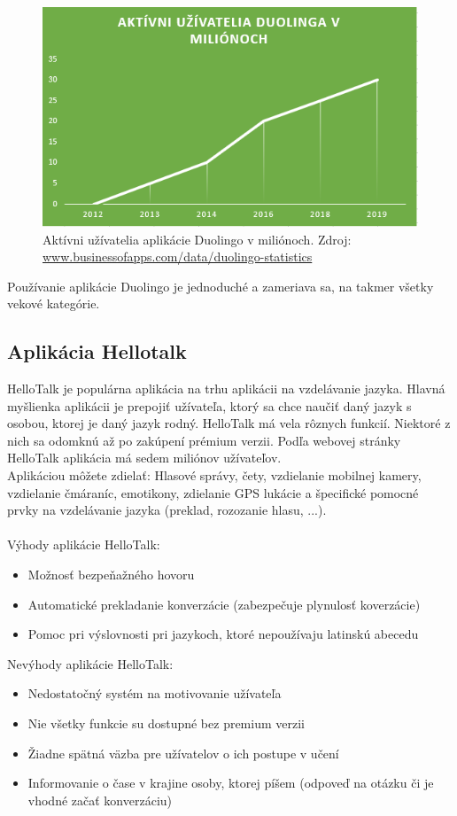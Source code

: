 \documentclass[10pt,oneside,slovak,a4paper]{article}
\begin{document}
\begin{figure}[h] %
\centering
\includegraphics[width=\textwidth]{duolingo.png}
\caption{ Aktívni užívatelia aplikácie Duolingo v miliónoch.
Zdroj: \href{https://www.businessofapps.com/data/duolingo-statistics/}{www.businessofapps.com/data/duolingo-statistics}}
\label{duo-uzivatelia}
\end{figure}

Používanie aplikácie Duolingo je jednoduché a zameriava sa, na takmer všetky vekové kategórie\cite{duolingo}.
\subsection{Aplikácia Hellotalk} %
HelloTalk je populárna aplikácia na trhu aplikácii na vzdelávanie jazyka. Hlavná myšlienka aplikácii je prepojiť užívateľa, ktorý sa chce naučiť daný jazyk s osobou, ktorej je daný jazyk rodný. HelloTalk má vela rôznych funkcií. Niektoré z nich sa odomknú až po zakúpení prémium verzii. Podľa webovej stránky HelloTalk aplikácia má sedem miliónov užívateľov.\cite{hellotalk}\\
Aplikáciou môžete zdielať: Hlasové správy, čety,  vzdielanie mobilnej kamery, vzdielanie čmáraníc, emotikony, zdielanie GPS lukácie a špecifické pomocné prvky na vzdelávanie jazyka (preklad, rozozanie hlasu, ...)\cite{hellotalk}.\\
\\
Výhody aplikácie HelloTalk:\cite{hellotalk}
\begin{itemize}
\item Možnosť bezpeňažného hovoru
\item Automatické prekladanie konverzácie (zabezpečuje plynulosť koverzácie)
\item Pomoc pri výslovnosti pri jazykoch, ktoré nepoužívaju latinskú abecedu
\end{itemize}
Nevýhody aplikácie HelloTalk:\cite{hellotalk}
\begin{itemize}
\item Nedostatočný systém na motivovanie užívateľa
\item Nie všetky funkcie su dostupné bez premium verzii
\item Žiadne spätná väzba pre užívatelov o ich postupe v učení 
\item Informovanie o čase v krajine osoby, ktorej píšem (odpoveď na otázku či je vhodné začať konverzáciu)
\end{itemize}
\end{document}
